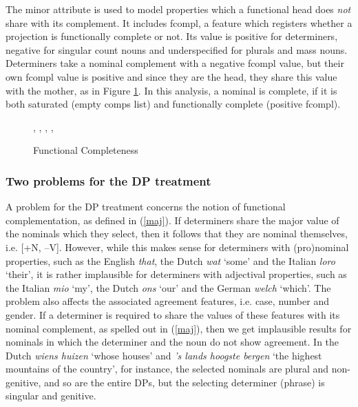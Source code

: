 \documentclass[output=paper]{langsci/langscibook}
\begin{document}
The {\sc minor} attribute is used to model properties which a functional head does {\em not} share with its 
complement. It includes {\sc fcompl}, a feature which registers whether a projection is 
functionally complete or not. Its value is positive for determiners, negative for  
singular count nouns and underspecified for plurals and mass nouns.  
Determiners take a nominal complement with a negative {\sc fcompl} value, but their 
own {\sc fcompl} value is positive and since they are the head, they share this value with 
the mother, as in Figure \ref{netter}. 
In this analysis, a nominal is complete, if it is both saturated 
(empty {\sc comps} list) and functionally complete (positive {\sc fcompl}). 

\begin{figure}
\begin{center}
\footnotesize
\tree
{,
  {,
    {}},
  {,
    {}}}
\caption{\label{netter} Functional Completeness }
\normalsize
\end{center}
\end{figure} 


\subsubsection{Two problems for the DP treatment}  


A problem for the DP treatment concerns the notion of 
functional complementation, as defined in (\ref{maj}). 
If determiners share the {\sc major} value of the nominals which they select, 
then it follows that they are nominal themselves, i.e. [+N, --V].
However, while this makes sense for determiners with (pro)nominal properties,
such as the English \emph{that}, the Dutch \emph{wat} `some' and the Italian 
\emph{loro} `their', it is rather implausible for determiners with adjectival properties,
such as the Italian \emph{mio} `my', the Dutch \emph{ons} `our' and the German
\emph{welch} `which'.   
The problem also affects the associated agreement features, i.e. {\sc case}, 
{\sc number} and {\sc gender}. If a determiner 
is required to share the values of these features with its nominal complement,
as spelled out in (\ref{maj}), then we get implausible results for nominals in 
which the determiner and the noun do not show agreement.    
In the Dutch \emph{wiens huizen} `whose houses' and 
\emph{'s lands hoogste bergen} `the highest mountains of the country', for instance,  
the selected nominals are plural and non-genitive, and so are the entire DPs, but 
the selecting determiner (phrase) is singular and genitive. 
\end{document}
